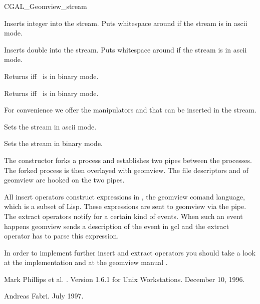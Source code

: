 \begin{ccClass}{CGAL_Geomview_stream}
\begin{ccAdvanced}
{Inserts integer  into the stream. Puts whitespace around if the
stream is in ascii mode.}


{Inserts double  into the stream. Puts whitespace around if the
stream is in ascii mode.}

{Returns  iff \ccVar\ is in binary mode.}

{Returns  iff \ccVar\ is in binary mode.}


For convenience we offer the manipulators  and 
that can be inserted in the stream.

{Sets the stream in ascii mode.}

{Sets the stream in binary mode.}

\end{ccAdvanced}


\begin{cprog}

\end{cprog} 

\ccImplementation

The constructor forks a process and establishes two pipes between the
processes. The forked process is then overlayed with geomview. The
file descriptors  and  of geomview are hooked
on the two pipes.

All insert operators construct expressions in , the geomview
comand language, which is a subset of {\sc Lisp}. These expressions
are sent to geomview via the pipe. The extract operators notify 
for a certain kind of events. When such an event happens geomview
sends a description of the event in gcl and the extract operator has
to parse this expression.

In order to implement further insert and extract operators you should
take a look at the implementation \cite{GV_Impl} and at the geomview
manual \cite{GVManual}.
\end{ccClass}

\begin{thebibliography}{10}

Mark Phillips et al.
.
\newblock Version 1.6.1 for Unix Workstations.
\newblock December 10, 1996.


Andreas Fabri.
\newblock July 1997. 

\end{thebibliography}

